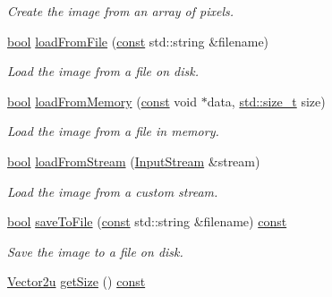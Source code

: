 \begin{DoxyCompactItemize}
\begin{DoxyCompactList}\small\item\em Create the image from an array of pixels. \end{DoxyCompactList}\item 
\hyperlink{term__entry_8h_a002004ba5d663f149f6c38064926abac}{bool} \hyperlink{classsf_1_1_image_a9e4f2aa8e36d0cabde5ed5a4ef80290b}{load\-From\-File} (\hyperlink{term__entry_8h_a57bd63ce7f9a353488880e3de6692d5a}{const} std\-::string \&filename)
\begin{DoxyCompactList}\small\item\em Load the image from a file on disk. \end{DoxyCompactList}\item 
\hyperlink{term__entry_8h_a002004ba5d663f149f6c38064926abac}{bool} \hyperlink{classsf_1_1_image_aaa6c7afa5851a51cec6ab438faa7354c}{load\-From\-Memory} (\hyperlink{term__entry_8h_a57bd63ce7f9a353488880e3de6692d5a}{const} void $\ast$data, \hyperlink{nc__alloc_8h_a7b60c5629e55e8ec87a4547dd4abced4}{std\-::size\-\_\-t} size)
\begin{DoxyCompactList}\small\item\em Load the image from a file in memory. \end{DoxyCompactList}\item 
\hyperlink{term__entry_8h_a002004ba5d663f149f6c38064926abac}{bool} \hyperlink{classsf_1_1_image_a21122ded0e8368bb06ed3b9acfbfb501}{load\-From\-Stream} (\hyperlink{classsf_1_1_input_stream}{Input\-Stream} \&stream)
\begin{DoxyCompactList}\small\item\em Load the image from a custom stream. \end{DoxyCompactList}\item 
\hyperlink{term__entry_8h_a002004ba5d663f149f6c38064926abac}{bool} \hyperlink{classsf_1_1_image_aec0ed16b67df7b512aaa5c53388ba14e}{save\-To\-File} (\hyperlink{term__entry_8h_a57bd63ce7f9a353488880e3de6692d5a}{const} std\-::string \&filename) \hyperlink{term__entry_8h_a57bd63ce7f9a353488880e3de6692d5a}{const} 
\begin{DoxyCompactList}\small\item\em Save the image to a file on disk. \end{DoxyCompactList}\item 
\hyperlink{namespacesf_a41039649eb65ea7646e2b97cfe124b4f}{Vector2u} \hyperlink{classsf_1_1_image_a5c3e9bebdc001c3ebf85ca97039fc86b}{get\-Size} () \hyperlink{term__entry_8h_a57bd63ce7f9a353488880e3de6692d5a}{const} 

\end{DoxyCompactItemize}
